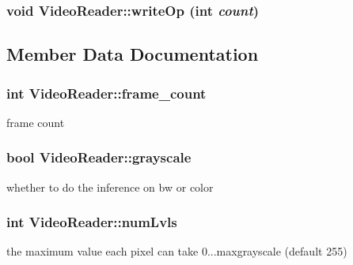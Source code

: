 \subsubsection{\setlength{\rightskip}{0pt plus 5cm}void VideoReader::writeOp (int {\em count})\hspace{0.3cm}{\tt  [inline]}}\label{classVideoReader_3fc9ed897920438db26fc0763810da2e}




\subsection{Member Data Documentation}
\subsubsection{\setlength{\rightskip}{0pt plus 5cm}int {\bf VideoReader::frame\_\-count}\hspace{0.3cm}{\tt  [private]}}\label{classVideoReader_2c12827293113d4542eaee2e1198a6d8}


frame count 

\subsubsection{\setlength{\rightskip}{0pt plus 5cm}bool {\bf VideoReader::grayscale}\hspace{0.3cm}{\tt  [private]}}\label{classVideoReader_aa47c27733a214e0c7de038d17788e1c}


whether to do the inference on bw or color 

\subsubsection{\setlength{\rightskip}{0pt plus 5cm}int {\bf VideoReader::numLvls}\hspace{0.3cm}{\tt  [private]}}\label{classVideoReader_e94b623322f96beb6113c7d8bcfc4e54}


the maximum value each pixel can take 0...maxgrayscale (default 255) 

